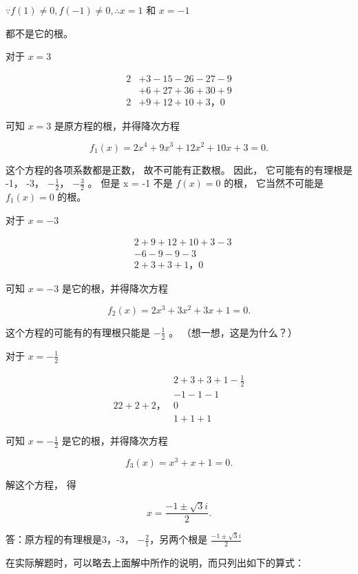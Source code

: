 \(\because f(1) \neq 0, f(-1) \neq 0, \therefore x = 1\) 和 \(x = -1\)

都不是它的根。

对于 \(x = 3\)

\[
\begin{array}{rl} {2} & {+ 3 - 15 - 26 - 27 - 9} \\ & {+ 6 + 27 + 36 + 30 + 9} \\ {2} & {+ 9 + 12 + 10 + 3\text{，} 0} \end{array}
\]

可知 \(x = 3\) 是原方程的根，并得降次方程

\[
f _ {1} (x) = 2 x ^ {4} + 9 x ^ {3} + 12 x ^ {2} + 10 x + 3 = 0.
\]

这个方程的各项系数都是正数， 故不可能有正数根。 因此，
它可能有的有理根是 -1， -3， \(-\frac{1}{2}\)， \(-\frac{3}{2}\) 。 但是
x = -1 不是 \(f(x) = 0\) 的根， 它当然不可能是 \(f_{1}(x) = 0\) 的根。

对于 \(x = -3\)

\[
\begin{array}{rl} & 2 + 9 + 12 + 10 + 3 - 3 \\ & - 6 - 9 - 9 - 3 \\ & 2 + 3 + 3 + 1\text{，} 0 \end{array}
\]

可知 \(x = -3\) 是它的根，并得降次方程

\[
f _ {2} (x) = 2 x ^ {3} + 3 x ^ {2} + 3 x + 1 = 0.
\]

这个方程的可能有的有理根只能是 \(-\frac{1}{2}\) 。
（想一想，这是为什么？）

对于 \(x = -\frac{1}{2}\)

\[
\begin{array}{rl} & 2 + 3 + 3 + 1 - \frac {1}{2} \\ & - 1 - 1 - 1 \\ 2 \boxed {2} + 2 + 2\text{，} & 0 \\ & 1 + 1 + 1 \end{array}
\]

可知 \(x = -\frac{1}{2}\) 是它的根，并得降次方程

\[
f _ {3} (x) = x ^ {3} + x + 1 = 0.
\]

解这个方程， 得

\[
x = \frac {- 1 \pm \sqrt {3} i}{2}.
\]

答：原方程的有理根是3，-3， \(-\frac{2}{1}\)，另两个根是
\(\frac{-1\pm\sqrt{3}i}{2}\)

在实际解题时，可以略去上面解中所作的说明，而只列出如下的算式：

